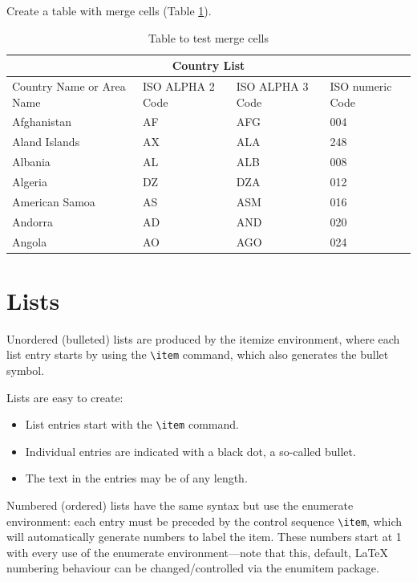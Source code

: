 \documentclass[12pt]{article}
\begin{document}
Create a table with merge cells (Table \ref{tab:Table3}).

\begin{table}[ht]
\centering
\begin{tabular}{ |p{3cm}||p{3cm}|p{3cm}|p{3cm}|  }
 \hline
 \multicolumn{4}{|c|}{Country List} \\
 \hline
 Country Name or Area Name& ISO ALPHA 2 Code &ISO ALPHA 3 Code&ISO numeric Code\\
 \hline
 Afghanistan   & AF    &AFG&   004\\
 Aland Islands&   AX  & ALA   &248\\
 Albania &AL & ALB&  008\\
 Algeria    &DZ & DZA&  012\\
 American Samoa&   AS  & ASM&016\\
 Andorra& AD  & AND   &020\\
 Angola& AO  & AGO&024\\
 \hline
\end{tabular}
\caption{Table to test merge cells}
\label{tab:Table3}
\end{table}

\section{Lists}
Unordered (bulleted) lists are produced by the itemize environment, where each list entry starts by using the \verb|\item| command, which also generates the bullet symbol.

Lists are easy to create:
\begin{itemize}
  \item List entries start with the \verb|\item| command.
  \item Individual entries are indicated with a black dot, a so-called bullet.
  \item The text in the entries may be of any length.
\end{itemize}

Numbered (ordered) lists have the same syntax but use the enumerate environment: each entry must be preceded by the control sequence  \verb|\item|, which will automatically generate numbers to label the item. These numbers start at 1 with every use of the enumerate environment—note that this, default, LaTeX numbering behaviour can be changed/controlled via the enumitem package.
\end{document}
